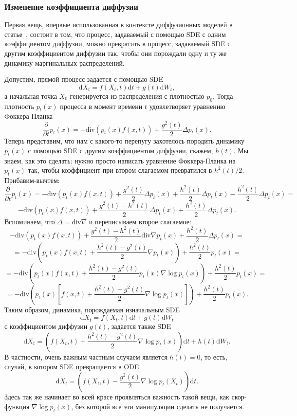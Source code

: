 \documentclass[12pt]{article}
\theoremstyle{definition}
\begin{document}
\subsubsection{Изменение коэффициента диффузии}
Первая вещь, впервые использованная в контексте диффузионных моделей в статье~\cite{song2020score}, состоит в том, что процесс, задаваемый с помощью SDE с одним коэффициентом диффузии, можно превратить в процесс, задаваемый SDE с другим коэффициентом диффузии так, чтобы они порождали одну и ту же динамику маргинальных распределений.

Допустим, прямой процесс задается с помощью SDE
\[
    \mathrm{d} X_t = f(X_t, t) \mathrm{d} t + g(t) \mathrm{d} W_t,
\]
а начальная точка $X_0$ генерируется из распределения с плотностью $p_0$. Тогда плотность $p_t(x)$ процесса в момент времени $t$ удовлетворяет уравнению Фоккера-Планка
\[
    \frac{\partial}{\partial t}p_t(x) = -\text{div}\left(p_t(x) f(x, t) \right) + \frac{g^2(t)}{2} \Delta p_t(x).
\]
Теперь представим, что нам с какого-то перепугу захотелось породить динамику $p_t(x)$ с помощью SDE с другим коэффициентом диффузии, скажем, $h(t)$. Мы знаем, как это сделать: нужно просто написать уравнение Фоккера-Планка на $p_t(x)$ так, чтобы коэффициент при втором слагаемом превратился в $h^2(t)/2$. Прибавим-вычтем:
\[
    \frac{\partial}{\partial t} p_t(x) = -\text{div}\left(p_t(x) f(x, t) \right) + \frac{g^2(t)}{2} \Delta p_t(x) + \frac{h^2(t)}{2} \Delta p_t(x) - \frac{h^2(t)}{2} \Delta p_t(x) = 
\]
\[
    -\text{div}\left(p_t(x) f(x, t) \right) + \frac{g^2(t) - h^2(t)}{2} \Delta p_t(x) + \frac{h^2(t)}{2}\Delta p_t(x).
\]
Вспоминаем, что $\Delta = \text{div} \nabla$ и переписываем второе слагаемое:
\[
    -\text{div}\left(p_t(x) f(x, t) \right) + \frac{g^2(t) - h^2(t)}{2} \text{div} \nabla p_t(x) + \frac{h^2(t)}{2}\Delta p_t(x) = 
\]
\[
    = -\text{div}\left(p_t(x) f(x, t) + \frac{h^2(t) - g^2(t)}{2} \nabla p_t(x) \right) + \frac{h^2(t)}{2}p_t(x) = 
\]
\[
    = -\text{div}\left(p_t(x) f(x, t) + \frac{h^2(t) - g^2(t)}{2} p_t(x) \nabla \log p_t(x) \right) + \frac{h^2(t)}{2}p_t(x) = 
\]
\[
    = -\text{div}\left(p_t(x) \left[f(x, t) + \frac{h^2(t) - g^2(t)}{2} \nabla \log p_t(x) \right]\right) + \frac{h^2(t)}{2}p_t(x).
\]
Таким образом, динамика, порождаемая изначальным SDE
\[
    \mathrm{d} X_t = f(X_t, t) \mathrm{d} t + g(t) \mathrm{d} W_t
\]
с коэффициентом диффузии $g(t)$, задается также SDE
\[
    \mathrm{d} X_t = \left(f(X_t, t) + \frac{h^2(t) - g^2(t)}{2} \nabla \log p_t(x) \right) \mathrm{d} t + h(t) \mathrm{d} W_t.
\]
В частности, очень важным частным случаем является $h(t) = 0$, то есть, случай, в котором SDE превращается в ODE
\[
    \mathrm{d} X_t = \left( f(X_t, t) - \frac{g^2(t)}{2} \nabla \log p_t(X_t) \right) \mathrm{d} t.
\]
Здесь так же начинает во всей красе проявляться важность такой вещи, как скор-функция $\nabla \log p_t(x)$, без которой все эти манипуляции сделать не получается.
\end{document}
